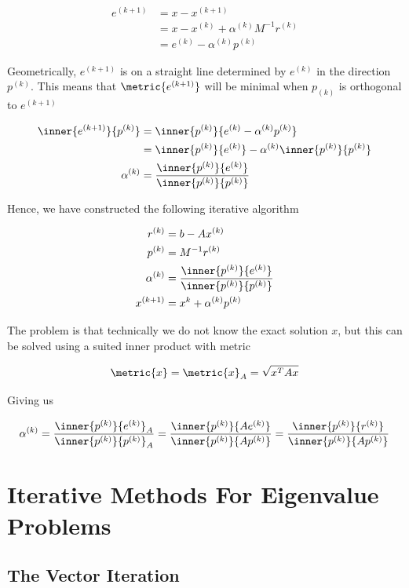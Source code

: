 \begin{align*} 
    e^{(k + 1)} &= x - x^{(k + 1)} \\ 
    &= x - x^{(k)} + \alpha^{(k)}M^{-1}r^{(k)} \\ 
    &= e^{(k)} - \alpha^{(k)}p^{(k)}
\end{align*}

Geometrically, \(e^{(k + 1)}\) is on a straight line determined by \(e^{(k)}\) in the direction \(p^{(k)}\). This means 
that \(\metric{e^{(k + 1)}}\) will be minimal when \(p_{(k)}\) is orthogonal to \(e^{(k + 1)}\)

\begin{align*}
    \inner{e^{(k + 1)}}{p^{(k)}} &= \inner{p^{(k)}}{e^{(k)} - \alpha^{(k)}p^{(k)}} \\ 
    &= \inner{p^{(k)}}{e^{(k)}} - \alpha^{(k)} \inner{p^{(k)}}{p^{(k)}} \\ 
    \alpha^{(k)} &= \frac{\inner{p^{(k)}}{e^{(k)}}}{\inner{p^{(k)}}{p^{(k)}}}
\end{align*}

Hence, we have constructed the following iterative algorithm 

\begin{align*}
   r^{(k)} &= b - Ax^{(k)}  \\
   p^{(k)} &= M^{-1}r^{(k)} \\ 
   \alpha^{(k)} &= \frac{\inner{p^{(k)}}{e^{(k)}}}{\inner{p^{(k)}}{p^{(k)}}} \\ 
   x^{(k + 1)} &= x^{k} + \alpha^{(k)}p^{(k)}
\end{align*}

The problem is that technically we do not know the exact solution \(x\), but this can be solved using a 
suited inner product with metric 

\[
    \metric{x} = \metric{x}_A = \sqrt{x^T A x}
\]

Giving us 

\[
   \alpha^{(k)} =  \frac{\inner{p^{(k)}}{e^{(k)}}_A}{\inner{p^{(k)}}{p^{(k)}}_A}
   = \frac{\inner{p^{(k)}}{Ae^{(k)}}}{\inner{p^{(k)}}{Ap^{(k)}}}
   = \frac{\inner{p^{(k)}}{r^{(k)}}}{\inner{p^{(k)}}{Ap^{(k)}}}
\]

\section{Iterative Methods For Eigenvalue Problems}

\subsection{The Vector Iteration}

